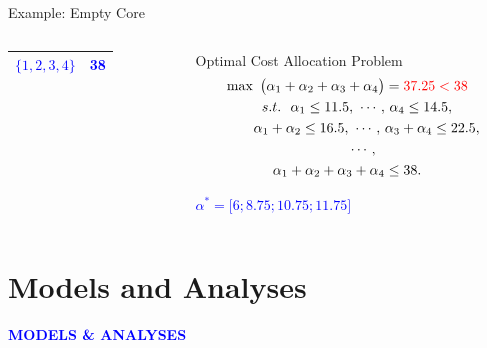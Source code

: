\documentclass[14pt]{beamer}
\begin{document}
\begin{frame}{Example: Empty Core}
\begin{columns}
\begin{column}{4.5cm}
\begin{table}[H]
\begin{tabular}[!h]{c c }
\textcolor{blue}{$\{1,2,3,4\}$}	&\textcolor{blue}{38}	\\
\hline
\end{tabular}
\end{table}
\end{column}
\pause
\begin{column}{6.5cm}
\footnotesize
\vspace{-1em}
\begin{shaded}
\centering
Optimal Cost Allocation Problem
\begin{eqnarray*}
\begin{aligned}
\max ~\big(\alpha_1 + \alpha_2 + \alpha_3 + \alpha_4\big) &= \textcolor{red}{37.25 < 38}\\
s.t.~~ \alpha_1 \leq 11.5,~\cdots,&~\alpha_4 \leq 14.5,\\
\alpha_1 + \alpha_2 \leq 16.5,~\cdots,~ &\alpha_3+\alpha_4 \leq 22.5,\\
~~~~~~~~~~\cdots,~~&\\
\alpha_1 + \alpha_2 + \alpha_3 + \alpha_4 &\leq 38.
\end{aligned}
\end{eqnarray*}
\vspace{-0.5em}
\end{shaded}
\begin{shaded}
\centering
\textcolor{blue}{
$\alpha^* = \big[6;8.75;10.75;11.75\big]$}
\end{shaded}
\end{column}
\end{columns}
\end{frame}



\section{Models and Analyses}
\begin{frame}
\centering
\large
\textcolor{blue}{\bf {\huge M}ODELS \&  {\huge A}NALYSES}
\end{frame}
\end{document}
